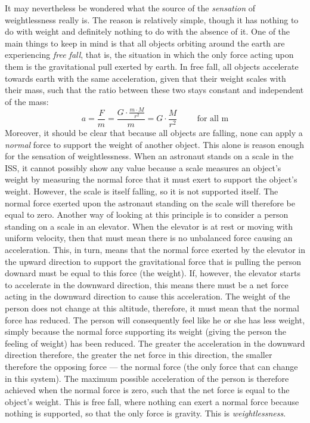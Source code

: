 It may nevertheless be wondered what the source of the \emph{sensation} of weightlessness really is. The reason is relatively simple, though it has nothing to do with weight and definitely nothing to do with the absence of it. One of the main things to keep in mind is that all objects orbiting around the earth are experiencing \emph{free fall}, that is, the situation in which the only force acting upon them is the gravitational pull exerted by earth. In free fall, all objects accelerate towards earth with the same acceleration, given that their weight scales with their mass, such that the ratio between these two stays constant and independent of the mass: $$a = \frac{F}{m} = \frac{G \cdot \frac{m \cdot M}{r^2}}{m} = G \cdot \frac{M}{r^2} \hspace{1cm} \text{for all m}$$ Moreover, it should be clear that because all objects are falling, none can apply a \emph{normal} force to support the weight of another object. This alone is reason enough for the sensation of weightlessness. When an astronaut stands on a scale in the ISS, it cannot possibly show any value because a scale measures an object's weight by measuring the normal force that it must exert to support the object's weight. However, the scale is itself falling, so it is not supported itself. The normal force exerted upon the astronaut standing on the scale will therefore be equal to zero. Another way of looking at this principle is to consider a person standing on a scale in an elevator. When the elevator is at rest or moving with uniform velocity, then that must mean there is no unbalanced force causing an acceleration. This, in turn, means that the normal force exerted by the elevator in the upward direction to support the gravitational force that is pulling the person downard must be equal to this force (the weight). If, however, the elevator starts to accelerate in the downward direction, this means there must be a net force acting in the downward direction to cause this acceleration. The weight of the person does not change at this altitude, therefore, it must mean that the normal force has reduced. The person will consequently feel like he or she has less weight, simply because the normal force supporting its weight (giving the person the feeling of weight) has been reduced. The greater the acceleration in the downward direction therefore, the greater the net force in this direction, the smaller therefore the opposing force --- the normal force (the only force that can change in this system). The maximum possible acceleration of the person is therefore achieved when the normal force is zero, such that the net force is equal to the object's weight. This is free fall, where nothing can exert a normal force because nothing is supported, so that the only force is gravity. This is \emph{weightlessness}.

